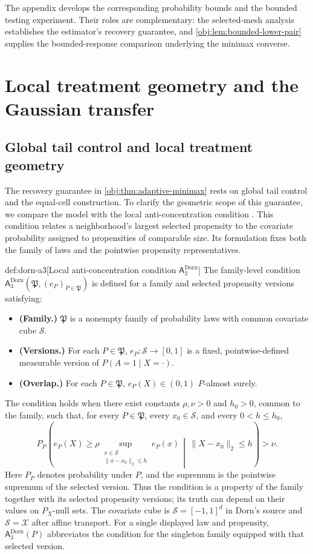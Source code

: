 \documentclass[11pt]{article}
\begin{document}
The appendix develops the corresponding probability bounds and the bounded testing experiment. Their roles are complementary: the selected-mesh analysis establishes the estimator's recovery guarantee, and \cref{obj:lem:bounded-lower-pair} supplies the bounded-response comparison underlying the minimax converse.


\section{Local treatment geometry and the Gaussian transfer}

\subsection{Global tail control and local treatment geometry}

The recovery guarantee in \cref{obj:thm:adaptive-minimax} rests on global tail control and the equal-cell construction. To clarify the geometric scope of this guarantee, we compare the model with the local anti-concentration condition . This condition relates a neighborhood's largest selected propensity to the covariate probability assigned to propensities of comparable size. Its formulation fixes both the family of laws and the pointwise propensity representatives.

\begin{definitionv}{def:dorn-a3}[Local anti-concentration condition $\mathsf A_3^{\mathrm{Dorn}}$]
The family-level condition
\(\mathsf A_3^{\mathrm{Dorn}}(\mathfrak P,(e_P)_{P\in\mathfrak P})\)
is defined for a family and selected propensity versions satisfying:
\begin{itemize}
\item \textbf{(Family.)} \(\mathfrak P\) is a nonempty family of probability laws with common covariate cube \(\mathcal S\).
\item \textbf{(Versions.)} For each \(P\in\mathfrak P\), \(e_P:\mathcal S\to[0,1]\) is a fixed, pointwise-defined measurable version of \(P(A=1\mid X=\cdot)\).
\item \textbf{(Overlap.)} For each \(P\in\mathfrak P\), \(e_P(X)\in(0,1)\) \(P\)-almost surely.
\end{itemize}
The condition holds when there exist constants \(\rho,\nu>0\) and \(h_0>0\), common to the family, such that, for every \(P\in\mathfrak P\), every \(x_0\in\mathcal S\), and every \(0<h\le h_0\),
\[
P_P\left(
e_P(X)\ge
\rho\sup_{\substack{x\in\mathcal S\\\|x-x_0\|_2\le h}}e_P(x)
\,\middle|\,
\|X-x_0\|_2\le h
\right)>\nu.
\]
Here \(P_P\) denotes probability under \(P\), and the supremum is the pointwise supremum of the selected version. Thus the condition is a property of the family together with its selected propensity versions; its truth can depend on their values on \(P_X\)-null sets. The covariate cube is \(\mathcal S=[-1,1]^d\) in Dorn's source and \(\mathcal S=\mathcal X\) after affine transport. For a single displayed law and propensity, \(\mathsf A_3^{\mathrm{Dorn}}(P)\) abbreviates the condition for the singleton family equipped with that selected version.
\end{definitionv}
\end{document}
